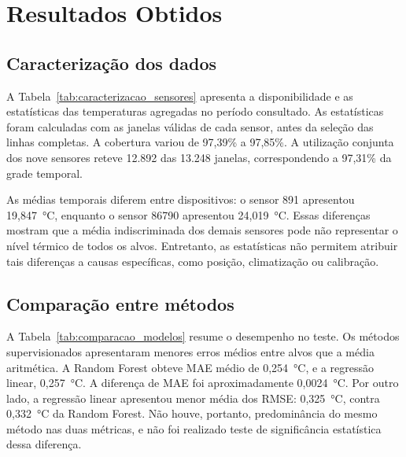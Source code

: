 \section{Resultados Obtidos}
\label{sec:resultados}

\subsection{Caracterização dos dados}
\label{subsec:caracterizacao_resultados}

A Tabela~\ref{tab:caracterizacao_sensores} apresenta a disponibilidade
e as estatísticas das temperaturas agregadas no período consultado.
As estatísticas foram calculadas com as janelas válidas de cada sensor,
antes da seleção das linhas completas. A cobertura variou de 97,39\%
a 97,85\%. A utilização conjunta dos nove sensores reteve 12.892
das 13.248 janelas, correspondendo a 97,31\% da grade temporal.

\begin{table}[htbp]
    \centering
    \caption{Disponibilidade e estatísticas das médias de cinco minutos.}
    \label{tab:caracterizacao_sensores}
    \small
    
    \fautor
\end{table}

As médias temporais diferem entre dispositivos: o sensor 891
apresentou 19,847~°C, enquanto o sensor 86790 apresentou 24,019~°C.
Essas diferenças mostram que a média indiscriminada dos demais
sensores pode não representar o nível térmico de todos os alvos.
Entretanto, as estatísticas não permitem atribuir tais diferenças
a causas específicas, como posição, climatização ou calibração.

\subsection{Comparação entre métodos}
\label{subsec:comparacao_metodos}

A Tabela~\ref{tab:comparacao_modelos} resume o desempenho no teste.
Os métodos supervisionados apresentaram menores erros médios entre
alvos que a média aritmética. A Random Forest obteve MAE médio de
0,254~°C, e a regressão linear, 0,257~°C. A diferença de MAE foi
aproximadamente 0,0024~°C. Por outro lado, a regressão linear apresentou
menor média dos RMSE: 0,325~°C, contra 0,332~°C da Random Forest.
Não houve, portanto, predominância do mesmo método nas duas métricas,
e não foi realizado teste de significância estatística dessa diferença.

